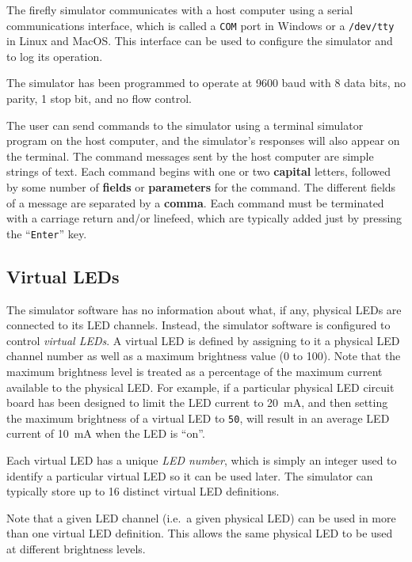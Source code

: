 \documentclass[letterpaper,11pt]{article}
\begin{document}
The firefly simulator communicates with a host computer using a serial
communications interface, which is called a \texttt{COM} port in Windows or a
\texttt{/dev/tty} in Linux and MacOS. This interface can be used to configure
the simulator and to log its operation.

The simulator has been programmed to operate at 9600 baud with 8 data bits,
no parity, 1 stop bit, and no flow control.

The user can send commands to the simulator using a terminal simulator program
on the host computer, and the simulator's responses will also appear on the
terminal. The command messages sent by the host computer are simple strings of
text. Each command begins with one or two \textbf{capital} letters, followed
by some number of \textbf{fields} or \textbf{parameters} for the command. The
different fields of a message are separated by a \textbf{comma}. Each command
must be terminated with a carriage return and/or linefeed, which are typically
added just by pressing the ``\texttt{Enter}'' key.

\subsection*{Virtual LEDs}

The simulator software has no information about what, if any, physical LEDs are
connected to its LED channels. Instead, the simulator software is configured to
control \textit{virtual LEDs}. A virtual LED is defined by assigning to it a
physical LED channel number as well as a maximum brightness value (0 to 100).
Note that the maximum brightness level is treated as a percentage of the
maximum current available to the physical LED. For example, if a particular
physical LED circuit board has been designed to limit the LED current to
\SI{20}{\milli\ampere}, and then setting the maximum brightness of a virtual
LED to \texttt{50}, will result in an average LED current of
\SI{10}{\milli\ampere} when the LED is ``on''.

Each virtual LED has a unique \textit{LED number}, which is simply an integer
used to identify a particular virtual LED so it can be used later. The
simulator can typically store up to 16 distinct virtual LED definitions.

Note that a given LED channel (i.e.\ a given physical LED) can be used in more
than one virtual LED definition. This allows the same physical LED to be used
at different brightness levels.
\end{document}

